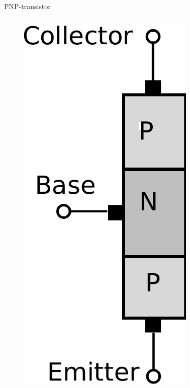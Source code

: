 \documentclass[beamer]{standalone}
\begin{document}
\begin{frame}
\begin{columns}[t]
\begin{column}{.5\textwidth}
 \end{column}
 \begin{column}{.5\textwidth}
  PNP-transistor
  \begin{columns}[t]
   \begin{column}{.40\textwidth}
    \begin{figure}
     \includegraphics[width=0.80\textwidth]{./pics/pnp_transistor.pdf}
    \end{figure}
   \end{column}

\end{columns}
\end{column}
\end{columns}
\end{frame}
\end{document}
